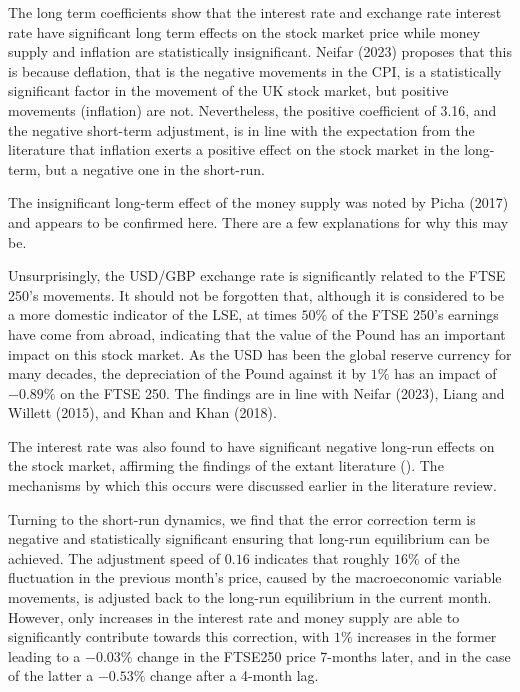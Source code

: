 \documentclass[12pt,a4paper]{article}
\begin{document}
The long term coefficients show that the interest rate and exchange rate
interest rate have significant long term effects on the stock market price
while money supply and inflation are statistically insignificant. Neifar (2023) 
proposes that this is because deflation, that is the negative movements in the 
CPI, is a statistically significant factor in the movement of the UK stock 
market, but positive movements (inflation) are not. Nevertheless, the positive
coefficient of 3.16, and the negative short-term adjustment, is in line with the expectation from the literature that 
inflation exerts a positive effect on the stock market in the long-term, but a negative 
one in the short-run. 

The insignificant long-term effect of the money supply 
was noted by Picha (2017) and appears to be confirmed here. There are a few explanations
for why this may be.

Unsurprisingly, the USD/GBP exchange rate is significantly related to the FTSE 250's movements. It 
should not be forgotten that, although it is considered to be a more domestic indicator of the LSE, 
at times $50\%$ of the FTSE 250's earnings have come from abroad, indicating that 
the value of the Pound has an important impact on this stock market. As the USD has been 
the global reserve currency for many decades, the depreciation of the Pound 
against it by $1\%$ has an impact of $-0.89\%$ on the FTSE 250. The findings 
are in line with Neifar (2023), Liang and Willett (2015), and Khan and Khan (2018).

The interest rate was also found to have significant negative long-run effects on the 
stock market, affirming the findings of the extant literature ().
The mechanisms by which this occurs were discussed earlier in the literature review.


Turning to the short-run dynamics, we find that the error correction term 
is negative and statistically significant ensuring that long-run equilibrium 
can be achieved. The adjustment speed of $0.16$ indicates that 
roughly $16\%$ of the fluctuation in the previous month's price, caused by the 
macroeconomic variable movements, is adjusted back to the long-run equilibrium in the current month.
However, only increases in the interest rate and money supply are able to 
significantly contribute towards this correction, with $1\%$ increases in the former 
leading to a $-0.03\%$ change in the FTSE250 price 7-months later, and in the case of the latter
a $-0.53\%$ change after a 4-month lag. 
\end{document}
